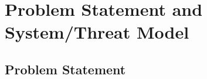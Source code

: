\section{Problem Statement and System/Threat Model}
\label{sec:problem}
\subsection{Problem Statement}





